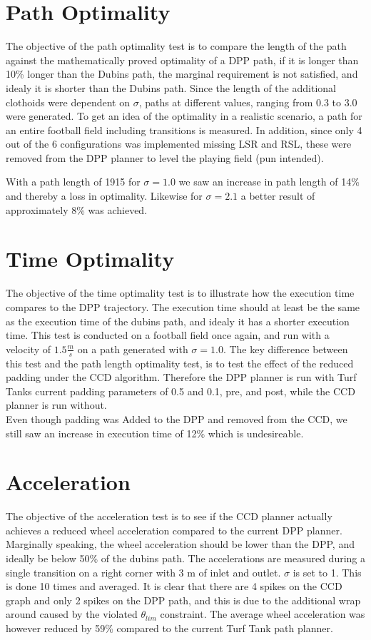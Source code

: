 \documentclass[a4paper]{article}
\begin{document}
\section{Path Optimality}
The objective of the path optimality test is to compare the length of the path against the mathematically proved optimality of a DPP path, if it is longer than 10\% longer than the Dubins path, the marginal requirement is not satisfied, and idealy it is shorter than the Dubins path. Since the length of the additional clothoids were dependent on $ \sigma $, paths at different values, ranging from $ 0.3 $ to $ 3.0 $ were generated. To get an idea of the optimality in a realistic scenario, a path for an entire football field including transitions is measured. In addition, since only 4 out of the 6 configurations was implemented missing LSR and RSL, these were removed from the DPP planner to level the playing field (pun intended). 

With a path length of 1915 for $ \sigma = 1.0 $ we saw an increase in path length of 14\% and thereby a loss in optimality. Likewise for $ \sigma = 2.1$ a better result of approximately 8\% was achieved. 


\section{Time Optimality} The objective of the time optimality test is to illustrate how the execution time compares to the DPP trajectory. The execution time should at least be the same as the execution time of the dubins path, and idealy it has a shorter execution time. This test is conducted on a football field once again, and run with a velocity of $ 1.5 \frac{m}{s} $ on a path generated with $ \sigma = 1.0 $. The key difference between this test and the path length optimality test, is to test the effect of the reduced padding under the  CCD algorithm. Therefore the DPP planner is run with Turf Tanks current padding parameters of 0.5 and 0.1, pre, and post, while the CCD planner is run without. \\ Even though padding was Added to the DPP and removed from the CCD, we still saw an increase in execution time of 12\% which is undesireable. 


\section{Acceleration}
The objective of the acceleration test is to see if the CCD planner actually achieves a reduced wheel acceleration compared to the current DPP planner. Marginally speaking, the wheel acceleration should be lower than the DPP, and ideally be below 50\% of the dubins path. The accelerations are measured during a single transition on a right corner with 3 m of inlet and outlet. $ \sigma  $ is set to 1. This is done 10 times and averaged. It is clear that there are 4 spikes on the CCD graph and only 2 spikes on the DPP path, and this is due to the additional wrap around caused by the violated $\theta_{lim}$ constraint. The average wheel acceleration was however reduced by 59\% compared to the current Turf Tank path planner. 
\end{document}
